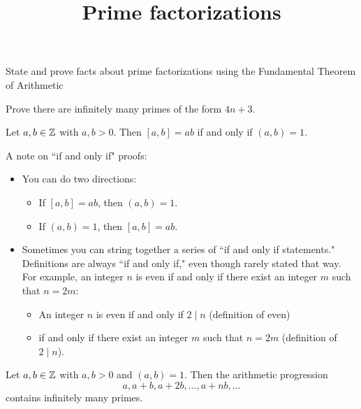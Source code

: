\documentclass{ximera}
\title{Prime factorizations}
\begin{document}
\begin{abstract}
\end{abstract}
\maketitle

\begin{obj}
    \item State and prove facts about prime factorizations using the Fundamental Theorem of Arithmetic
    \item Prove there are infinitely many primes of the form $4n+3$.
\end{obj}


\begin{corollary}\label{cor:lcm-gcd}
 Let $a,b\in\mathbb Z$ with $a,b>0$. Then $[a,b]=ab$ if and only if $(a,b)=1$.
\end{corollary}
A note on ``if and only if" proofs: 
\begin{itemize}
 \item You can do two directions: 
\begin{itemize}
 \item  If $[a,b]=ab$, then $(a,b)=1$.
 \item  If $(a,b)=1$, then $[a,b]=ab$.
\end{itemize}
\item Sometimes you can string together a series of ``if and only if statements." Definitions are always ``if and only if," even though rarely stated that way. For example, an integer $n$ is even if and only if there exist an integer $m$ such that $n=2m$:
\begin{itemize}
 \item An integer $n$ is even if and only if $2\mid n$ (definition of even) 
 \item if and only if there exist an integer $m$ such that $n=2m$ (definition of $2\mid n$).
\end{itemize}
\end{itemize}

\begin{theorem}\label{thm:dirichlet}
    Let $a,b\in\mathbb Z$ with $a,b>0$ and $(a,b)=1$. Then the arithmetic progression \[a,a+b, a+2b, \dots, a+nb,\dots\]
    contains infinitely many primes.
\end{theorem}
\end{document}
